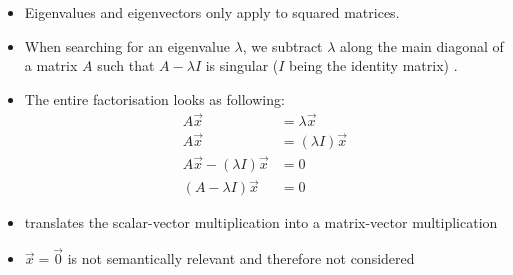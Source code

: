 \begin{itemize}
	\item Eigenvalues and eigenvectors only apply to squared matrices.
	\item When searching for an eigenvalue $\lambda$, we subtract $\lambda$ along the main diagonal of a matrix $A$ such that $A - \lambda I$ is \gls{singular} ($I$ being the identity matrix) \cite{Strang2005tn}.
	\item The entire factorisation looks as following:
	\begin{align}
		\label{formula:eigenONE}
		A \overrightarrow{x} &= \lambda \overrightarrow{x} 
		\\
		\label{formula:eigenTWO}
		A \overrightarrow{x} &= (\lambda I) \overrightarrow{x}
		\\
		\label{formula:eigenTHREE}
		A \overrightarrow{x} - (\lambda I) \overrightarrow{x} &= 0
		\\
		\label{formula:eigenFOUR}
		(A - \lambda  I) \overrightarrow{x} &= 0
	\end{align}
	\item {} translates the scalar-vector multiplication into a matrix-vector multiplication
	\item $\overrightarrow{x} = \overrightarrow{0}$ is not semantically relevant and therefore not considered
\end{itemize}




